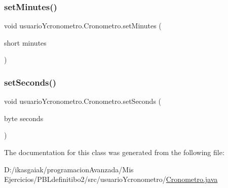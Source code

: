 \subsubsection{\texorpdfstring{set\+Minutes()}{setMinutes()}}
{\footnotesize\ttfamily void usuario\+Ycronometro.\+Cronometro.\+set\+Minutes (\begin{DoxyParamCaption}\item[{short}]{minutes }\end{DoxyParamCaption})}

\mbox{\label{classusuario_ycronometro_1_1_cronometro_a1af580bc1a16038f60d9ea245a265d7e}} 
\subsubsection{\texorpdfstring{set\+Seconds()}{setSeconds()}}
{\footnotesize\ttfamily void usuario\+Ycronometro.\+Cronometro.\+set\+Seconds (\begin{DoxyParamCaption}\item[{byte}]{seconds }\end{DoxyParamCaption})}



The documentation for this class was generated from the following file\+:\begin{DoxyCompactItemize}
\item 
D\+:/ikasgaiak/programacion\+Avanzada/\+Mis Ejercicios/\+P\+B\+Ldefinitibo2/src/usuario\+Ycronometro/\mbox{\hyperlink{_cronometro_8java}{Cronometro.\+java}}\end{DoxyCompactItemize}
